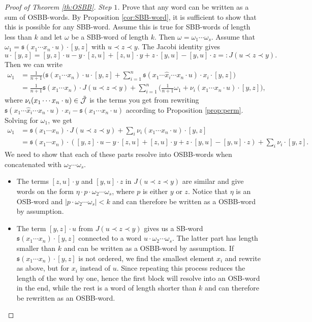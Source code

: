 \documentclass[10pt,a4paper]{amsart}
\newcommand{\s}{\ensuremath{\mathfrak{s}}}
\numberwithin{equation}{section}
\begin{document}
\begin{proof}[Proof of Theorem \ref{th:OSBB}]
 \textit{Step $1$.} Prove that any word can be written as a sum of OSBB-words. By Proposition \ref{cor:SBB-word}, it is sufficient to show that this is possible for any SBB-word. Assume this is true for SBB-words of length less than $k$ and let $\omega$ be a SBB-word of length $k$. Then $\omega= \omega_1 \cdots \omega_s$. Assume that $\omega_1 = \s(x_1 \cdots x_n \cdot u) \cdot [y,z]$ with $u \prec z \prec y$. The Jacobi identity gives
 \[
 u \cdot[y,z] = [y,z] \cdot u - y \cdot [z, u] + [z,u]\cdot y + z \cdot [y,u] - [y,u]\cdot z =: J(u \prec z \prec y).
 \]
 Then we can write
 \[
 \begin{split}
 \omega_1 &= \frac{1}{n+1} \Biggl( \s(x_1 \cdots x_n) \cdot u \cdot [y,z] + \sum_{i=1}^n \s(x_1 \cdots \hat{x}_i \cdots x_n \cdot u)\cdot x_i \cdot [y,z] \Biggr) \\
 &= \frac{1}{n+1} \s(x_1 \cdots x_n) \cdot J(u \prec z \prec y) + \sum_{i=1}^n \biggl( \frac{1}{n+1} \omega_1 + \nu_i(x_1 \cdots x_n \cdot u) \cdot [y,z]\biggr),
 \end{split}
 \]
 where $\nu_i(x_1 \cdots x_n \cdot u) \in \Tilde{\mathcal{J}}$ is the terms you get from rewriting $\s(x_1 \cdots \hat{x}_i \cdots x_n \cdot u) \cdot x_i - \s{(x_1 \cdots x_n \cdot u)}$ according to Proposition \ref{prop:perm}. Solving for $\omega_1$, we get
 \begin{align}
 \omega_1 &= \s(x_1 \cdots x_n) \cdot J(u \prec z \prec y) + \sum_i \nu_i(x_1 \cdots x_n \cdot u) \cdot [y,z]\label{eq:OSBB_rewrite}\\
 &= \s(x_1 \cdots x_n) \cdot ( [y,z] \cdot u - y \cdot [z, u] + [z,u]\cdot y + z \cdot [y,u] - [y,u]\cdot z ) + \sum_i \nu_i \cdot [y,z].\nonumber
 \end{align}
 We need to show that each of these parts resolve into OSBB-words when concatenated with $\omega_2 \cdots \omega_s$.
 \begin{itemize}\itemsep=0pt
 \item The terms $[z,u]\cdot y$ and $[y,u]\cdot z$ in $J(u\prec z\prec y)$ are similar and give words on the form $\eta \cdot p \cdot\omega_2 \cdots \omega_s$, where $p$ is either $y$ or $z$. Notice that $\eta$ is an OSB-word and $|p \cdot \omega_2 \cdots \omega_s|<k$ and can therefore be written as a OSBB-word by assumption.
 \item The term $[y,z]\cdot u$ from $J(u \prec z \prec y)$ gives us a SB-word $\s(x_1 \cdots x_n)\cdot [y,z]$ connected to a word $u \cdot \omega_2 \cdots \omega_s$. The latter part has length smaller than $k$ and can be written as a OSBB-word by assumption. If $\s(x_1 \cdots x_n)\cdot [y,z]$ is not ordered, we find the smallest element $x_i$ and rewrite as above, but for $x_i$ instead of $u$. Since repeating this process reduces the length of the word by one, hence the first block will resolve into an OSB-word in the end, while the rest is a word of length shorter than $k$ and can therefore be rewritten as an OSBB-word.

\end{itemize}
\end{proof}
\end{document}
